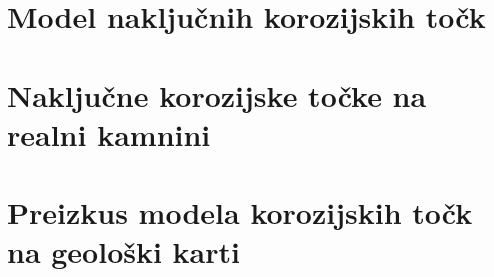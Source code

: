 \documentclass[a4paper, oneside, 12pt]{book}
\begin{document}
\section{Model naključnih korozijskih točk}
\section{Naključne korozijske točke na realni kamnini}
\section{Preizkus modela korozijskih točk na geološki karti}

\nocite{*}
\newpage
{}

\end{document}
